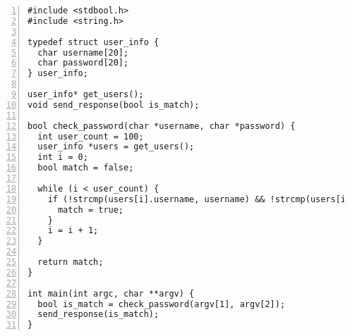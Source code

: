 \begin{lstlisting}[style=dlmc, numbers=left]
#include <stdbool.h>
#include <string.h>

typedef struct user_info {
  char username[20];
  char password[20];
} user_info;

user_info* get_users();
void send_response(bool is_match);

bool check_password(char *username, char *password) {
  int user_count = 100;
  user_info *users = get_users();
  int i = 0;
  bool match = false;

  while (i < user_count) {
    if (!strcmp(users[i].username, username) && !strcmp(users[i].password, password)) {
      match = true;
    }
    i = i + 1;
  }

  return match;
}

int main(int argc, char **argv) {
  bool is_match = check_password(argv[1], argv[2]);
  send_response(is_match);
}
\end{lstlisting}
